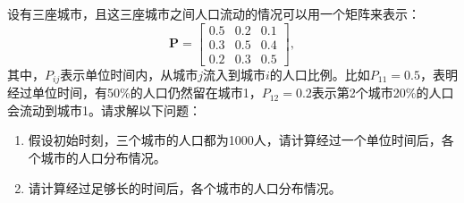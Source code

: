 \begin{example}
    设有三座城市，且这三座城市之间人口流动的情况可以用一个矩阵来表示：
    \[
        \mathbf{P} =
        \begin{bmatrix}
            0.5 & 0.2 & 0.1 \\
            0.3 & 0.5 & 0.4 \\
            0.2 & 0.3 & 0.5
        \end{bmatrix},
    \]
    其中，\( P_{ij} \)表示单位时间内，从城市\( j \)流入到城市\( i \)的人口比例。比如\( P_{11} = 0.5 \)，表明经过单位时间，有50\%的人口仍然留在城市1，\( P_{12} = 0.2 \)表示第2个城市20\%的人口会流动到城市1。请求解以下问题：
    \begin{enumerate}
        \item 假设初始时刻，三个城市的人口都为1000人，请计算经过一个单位时间后，各个城市的人口分布情况。
        \item 请计算经过足够长的时间后，各个城市的人口分布情况。
    \end{enumerate}
\end{example}
